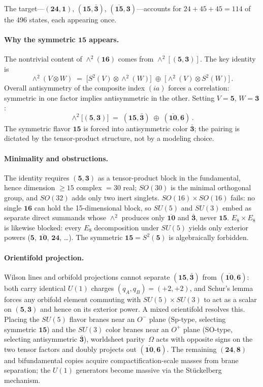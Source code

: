 \noindent
The target---$(\mathbf{24},\mathbf{1})$,
$(\mathbf{15},\bar{\mathbf{3}})$,
$(\overline{\mathbf{15}},\mathbf{3})$---accounts
for $24 + 45 + 45 = 114$ of the 496 states, each appearing once.

\paragraph{Why the symmetric $\mathbf{15}$ appears.}
The nontrivial content of $\wedge^2(\mathbf{16})$ comes from
$\wedge^2[(\mathbf{5},\mathbf{3})]$.  The key identity is
$$
\wedge^2(V \otimes W)
  \;=\; \bigl[S^2(V) \otimes \wedge^2(W)\bigr]
  \;\oplus\; \bigl[\wedge^2(V) \otimes S^2(W)\bigr]\,.
$$
Overall antisymmetry of the composite index $(ia)$ forces a
correlation: symmetric in one factor implies antisymmetric in the
other.  Setting $V = \mathbf{5}$, $W = \mathbf{3}$:
$$
\wedge^2\bigl[(\mathbf{5},\mathbf{3})\bigr]
  \;=\; (\mathbf{15},\bar{\mathbf{3}})
  \;\oplus\; (\overline{\mathbf{10}},\mathbf{6})\,.
$$
The symmetric flavor $\mathbf{15}$ is forced into antisymmetric
color $\bar{\mathbf{3}}$; the pairing is dictated by the
tensor-product structure, not by a modeling choice.

\paragraph{Minimality and obstructions.}
The identity requires $(\mathbf{5},\mathbf{3})$ as a
tensor-product block in the fundamental, hence dimension
$\geq 15$ complex $= 30$ real; $SO(30)$ is the minimal
orthogonal group, and $SO(32)$ adds only two inert singlets.
$SO(16) \times SO(16)$ fails: no single $\mathbf{16}$ can hold
the 15-dimensional block, so $SU(5)$ and $SU(3)$ embed as
separate direct summands whose $\wedge^2$ produces only
$\overline{\mathbf{10}}$ and $\bar{\mathbf{3}}$, never
$\mathbf{15}$.
$E_8 \times E_8$ is likewise blocked: every $E_8$ decomposition
under $SU(5)$ yields only exterior powers
($\mathbf{5}$, $\overline{\mathbf{10}}$, $\mathbf{24}$, \ldots).
The symmetric $\mathbf{15} = S^2(\mathbf{5})$ is algebraically
forbidden.

\paragraph{Orientifold projection.}
Wilson lines and orbifold projections cannot separate
$(\mathbf{15},\bar{\mathbf{3}})$ from
$(\overline{\mathbf{10}},\mathbf{6})$: both carry identical
$U(1)$ charges $(q_A, q_B) = (+2,+2)$, and Schur's lemma forces
any orbifold element commuting with $SU(5) \times SU(3)$ to act
as a scalar on $(\mathbf{5},\mathbf{3})$ and hence on its exterior
power.
A mixed orientifold resolves this.  Placing the $SU(5)$ flavor
branes near an $O^-$ plane (Sp-type, selecting symmetric
$\mathbf{15}$) and the $SU(3)$ color branes near an $O^+$ plane
(SO-type, selecting antisymmetric $\bar{\mathbf{3}}$), worldsheet
parity~$\Omega$ acts with opposite signs on the two tensor
factors and doubly projects out
$(\overline{\mathbf{10}},\mathbf{6})$.  The remaining
$(\mathbf{24},\mathbf{8})$ and bifundamental copies acquire
compactification-scale masses from brane separation; the $U(1)$
generators become massive via the St\"uckelberg mechanism.

